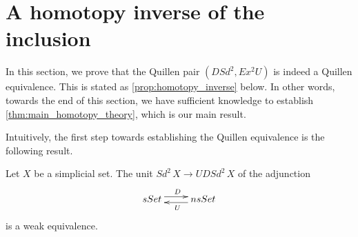 
\section{A homotopy inverse of the inclusion}
\label{sec:inverse}

In this section, we prove that the Quillen pair $(DSd^2,Ex^2U)$ is indeed a Quillen equivalence. This is stated as \cref{prop:homotopy_inverse} below. In other words, towards the end of this section, we have sufficient knowledge to establish \cref{thm:main_homotopy_theory}, which is our main result.

Intuitively, the first step towards establishing the Quillen equivalence is the following result.
\begin{proposition}\label{prop:desing_double_subdvision_homotopy_inverse}
Let $X$ be a simplicial set. The unit $Sd^2\, X\to UDSd^2\, X$ of the adjunction
\begin{displaymath}
 \xymatrix{
 sSet \ar@<+.7ex>[r]^D & nsSet \ar@<+.7ex>[l]^U
 }
\end{displaymath}
is a weak equivalence.
\end{proposition}
